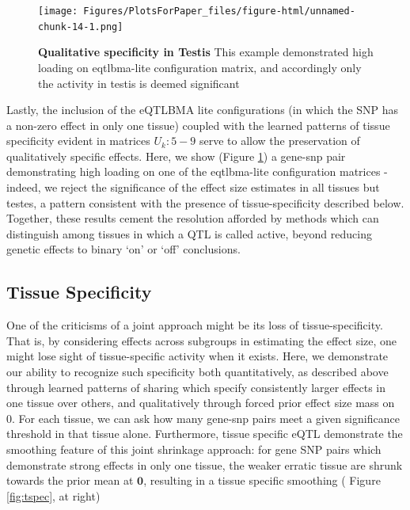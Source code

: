 \newline
\begin{figure}[htbp]
\texttt{[image: Figures/PlotsForPaper\_files/figure-html/unnamed-chunk-14-1.png]}\\
\caption{\textbf{Qualitative specificity in Testis} This example demonstrated high loading on eqtlbma-lite configuration matrix, and accordingly only the activity in testis is deemed significant}
\label{fig:testis}
\end{figure}\newline

Lastly, the inclusion of the eQTLBMA lite configurations (in which the SNP has a non-zero effect in only one tissue) coupled with the learned patterns of tissue specificity evident in matrices $U_{k}: 5-9$ serve to allow the preservation of qualitatively specific effects. Here, we show (Figure \ref{fig:testis}) a gene-snp pair demonstrating high loading on one of the eqtlbma-lite configuration matrices - indeed, we reject the significance of the effect size estimates in all tissues but testes, a pattern consistent with the presence of tissue-specificity described below. Together, these results cement the resolution afforded by methods which can distinguish among tissues in which a QTL is called active, beyond reducing genetic effects to binary `on' or `off' conclusions.


\subsection{Tissue Specificity}

One of the criticisms of a joint approach might be its loss of tissue-specificity. That is, by considering effects across subgroups in estimating the effect size, one might lose sight of tissue-specific activity when it exists. Here, we demonstrate our ability to recognize such specificity both quantitatively, as described above through learned patterns of sharing which specify consistently larger effects in one tissue over others, and qualitatively through forced prior effect size mass on 0.  For each tissue, we can ask how many gene-snp pairs meet a given significance threshold in that tissue alone. Furthermore, tissue specific eQTL demonstrate the smoothing feature of this joint shrinkage approach: for gene SNP pairs which demonstrate strong effects in only one tissue, the weaker erratic tissue are shrunk towards the prior mean at $\bm{0}$, resulting in a tissue specific smoothing ( Figure \ref{fig:tspec}, at right) \newline


